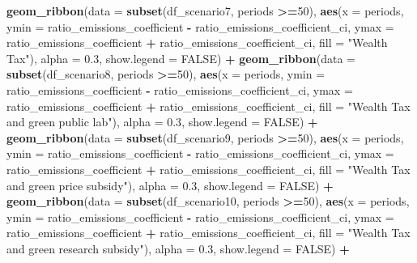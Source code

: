 \documentclass[
]{article}
\newenvironment{Shaded}{\begin{snugshade}}{\end{snugshade}}
\newcommand{\AttributeTok}[1]{\textcolor[rgb]{0.13,0.29,0.53}{#1}}
\newcommand{\ConstantTok}[1]{\textcolor[rgb]{0.56,0.35,0.01}{#1}}
\newcommand{\DecValTok}[1]{\textcolor[rgb]{0.00,0.00,0.81}{#1}}
\newcommand{\FloatTok}[1]{\textcolor[rgb]{0.00,0.00,0.81}{#1}}
\newcommand{\FunctionTok}[1]{\textcolor[rgb]{0.13,0.29,0.53}{\textbf{#1}}}
\newcommand{\NormalTok}[1]{#1}
\newcommand{\SpecialCharTok}[1]{\textcolor[rgb]{0.81,0.36,0.00}{\textbf{#1}}}
\newcommand{\StringTok}[1]{\textcolor[rgb]{0.31,0.60,0.02}{#1}}
\begin{document}
\begin{Shaded}
\begin{Highlighting}[]
  \FunctionTok{geom\_ribbon}\NormalTok{(}\AttributeTok{data =} \FunctionTok{subset}\NormalTok{(df\_scenario7, periods }\SpecialCharTok{\textgreater{}=}\DecValTok{50}\NormalTok{), }\FunctionTok{aes}\NormalTok{(}\AttributeTok{x =}\NormalTok{ periods, }\AttributeTok{ymin =}\NormalTok{ ratio\_emissions\_coefficient }\SpecialCharTok{{-}}\NormalTok{ ratio\_emissions\_coefficient\_ci, }\AttributeTok{ymax =}\NormalTok{ ratio\_emissions\_coefficient }\SpecialCharTok{+}\NormalTok{ ratio\_emissions\_coefficient\_ci, }\AttributeTok{fill =} \StringTok{"Wealth Tax"}\NormalTok{), }\AttributeTok{alpha =} \FloatTok{0.3}\NormalTok{, }\AttributeTok{show.legend =} \ConstantTok{FALSE}\NormalTok{) }\SpecialCharTok{+}
  \FunctionTok{geom\_ribbon}\NormalTok{(}\AttributeTok{data =} \FunctionTok{subset}\NormalTok{(df\_scenario8, periods }\SpecialCharTok{\textgreater{}=}\DecValTok{50}\NormalTok{), }\FunctionTok{aes}\NormalTok{(}\AttributeTok{x =}\NormalTok{ periods, }\AttributeTok{ymin =}\NormalTok{ ratio\_emissions\_coefficient }\SpecialCharTok{{-}}\NormalTok{ ratio\_emissions\_coefficient\_ci, }\AttributeTok{ymax =}\NormalTok{ ratio\_emissions\_coefficient }\SpecialCharTok{+}\NormalTok{ ratio\_emissions\_coefficient\_ci, }\AttributeTok{fill =} \StringTok{"Wealth Tax and green public lab"}\NormalTok{), }\AttributeTok{alpha =} \FloatTok{0.3}\NormalTok{, }\AttributeTok{show.legend =} \ConstantTok{FALSE}\NormalTok{) }\SpecialCharTok{+}
  \FunctionTok{geom\_ribbon}\NormalTok{(}\AttributeTok{data =} \FunctionTok{subset}\NormalTok{(df\_scenario9, periods }\SpecialCharTok{\textgreater{}=}\DecValTok{50}\NormalTok{), }\FunctionTok{aes}\NormalTok{(}\AttributeTok{x =}\NormalTok{ periods, }\AttributeTok{ymin =}\NormalTok{ ratio\_emissions\_coefficient }\SpecialCharTok{{-}}\NormalTok{ ratio\_emissions\_coefficient\_ci, }\AttributeTok{ymax =}\NormalTok{ ratio\_emissions\_coefficient }\SpecialCharTok{+}\NormalTok{ ratio\_emissions\_coefficient\_ci, }\AttributeTok{fill =} \StringTok{"Wealth Tax and green price subsidy"}\NormalTok{), }\AttributeTok{alpha =} \FloatTok{0.3}\NormalTok{, }\AttributeTok{show.legend =} \ConstantTok{FALSE}\NormalTok{) }\SpecialCharTok{+}
  \FunctionTok{geom\_ribbon}\NormalTok{(}\AttributeTok{data =} \FunctionTok{subset}\NormalTok{(df\_scenario10, periods }\SpecialCharTok{\textgreater{}=}\DecValTok{50}\NormalTok{), }\FunctionTok{aes}\NormalTok{(}\AttributeTok{x =}\NormalTok{ periods, }\AttributeTok{ymin =}\NormalTok{ ratio\_emissions\_coefficient }\SpecialCharTok{{-}}\NormalTok{ ratio\_emissions\_coefficient\_ci, }\AttributeTok{ymax =}\NormalTok{ ratio\_emissions\_coefficient }\SpecialCharTok{+}\NormalTok{ ratio\_emissions\_coefficient\_ci, }\AttributeTok{fill =} \StringTok{"Wealth Tax and green research subsidy"}\NormalTok{), }\AttributeTok{alpha =} \FloatTok{0.3}\NormalTok{, }\AttributeTok{show.legend =} \ConstantTok{FALSE}\NormalTok{) }\SpecialCharTok{+}

\end{Highlighting}
\end{Shaded}
\end{document}
